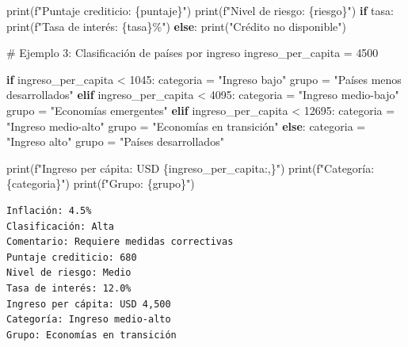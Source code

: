 \documentclass[
  doc,
  floatsintext,
  longtable,
  a4paper,
  nolmodern,
  notxfonts,
  notimes,
  12pt,
  colorlinks=true,linkcolor=blue,citecolor=blue,urlcolor=blue]{apa7}
\newenvironment{Shaded}{\begin{snugshade}}{\end{snugshade}}
\newcommand{\BuiltInTok}[1]{\textcolor[rgb]{0.00,0.23,0.31}{#1}}
\newcommand{\CommentTok}[1]{\textcolor[rgb]{0.37,0.37,0.37}{#1}}
\newcommand{\ControlFlowTok}[1]{\textcolor[rgb]{0.00,0.23,0.31}{\textbf{#1}}}
\newcommand{\DecValTok}[1]{\textcolor[rgb]{0.68,0.00,0.00}{#1}}
\newcommand{\NormalTok}[1]{\textcolor[rgb]{0.00,0.23,0.31}{#1}}
\newcommand{\OperatorTok}[1]{\textcolor[rgb]{0.37,0.37,0.37}{#1}}
\newcommand{\SpecialCharTok}[1]{\textcolor[rgb]{0.37,0.37,0.37}{#1}}
\newcommand{\SpecialStringTok}[1]{\textcolor[rgb]{0.13,0.47,0.30}{#1}}
\newcommand{\StringTok}[1]{\textcolor[rgb]{0.13,0.47,0.30}{#1}}
\begin{document}
\begin{Shaded}
\begin{Highlighting}[]
\BuiltInTok{print}\NormalTok{(}\SpecialStringTok{f"Puntaje crediticio: }\SpecialCharTok{\{}\NormalTok{puntaje}\SpecialCharTok{\}}\SpecialStringTok{"}\NormalTok{)}
\BuiltInTok{print}\NormalTok{(}\SpecialStringTok{f"Nivel de riesgo: }\SpecialCharTok{\{}\NormalTok{riesgo}\SpecialCharTok{\}}\SpecialStringTok{"}\NormalTok{)}
\ControlFlowTok{if}\NormalTok{ tasa:}
    \BuiltInTok{print}\NormalTok{(}\SpecialStringTok{f"Tasa de interés: }\SpecialCharTok{\{}\NormalTok{tasa}\SpecialCharTok{\}}\SpecialStringTok{\%"}\NormalTok{)}
\ControlFlowTok{else}\NormalTok{:}
    \BuiltInTok{print}\NormalTok{(}\StringTok{"Crédito no disponible"}\NormalTok{)}

\CommentTok{\# Ejemplo 3: Clasificación de países por ingreso}
\NormalTok{ingreso\_per\_capita }\OperatorTok{=} \DecValTok{4500}

\ControlFlowTok{if}\NormalTok{ ingreso\_per\_capita }\OperatorTok{\textless{}} \DecValTok{1045}\NormalTok{:}
\NormalTok{    categoria }\OperatorTok{=} \StringTok{"Ingreso bajo"}
\NormalTok{    grupo }\OperatorTok{=} \StringTok{"Países menos desarrollados"}
\ControlFlowTok{elif}\NormalTok{ ingreso\_per\_capita }\OperatorTok{\textless{}} \DecValTok{4095}\NormalTok{:}
\NormalTok{    categoria }\OperatorTok{=} \StringTok{"Ingreso medio{-}bajo"}
\NormalTok{    grupo }\OperatorTok{=} \StringTok{"Economías emergentes"}
\ControlFlowTok{elif}\NormalTok{ ingreso\_per\_capita }\OperatorTok{\textless{}} \DecValTok{12695}\NormalTok{:}
\NormalTok{    categoria }\OperatorTok{=} \StringTok{"Ingreso medio{-}alto"}
\NormalTok{    grupo }\OperatorTok{=} \StringTok{"Economías en transición"}
\ControlFlowTok{else}\NormalTok{:}
\NormalTok{    categoria }\OperatorTok{=} \StringTok{"Ingreso alto"}
\NormalTok{    grupo }\OperatorTok{=} \StringTok{"Países desarrollados"}

\BuiltInTok{print}\NormalTok{(}\SpecialStringTok{f"Ingreso per cápita: USD }\SpecialCharTok{\{}\NormalTok{ingreso\_per\_capita}\SpecialCharTok{:,\}}\SpecialStringTok{"}\NormalTok{)}
\BuiltInTok{print}\NormalTok{(}\SpecialStringTok{f"Categoría: }\SpecialCharTok{\{}\NormalTok{categoria}\SpecialCharTok{\}}\SpecialStringTok{"}\NormalTok{)}
\BuiltInTok{print}\NormalTok{(}\SpecialStringTok{f"Grupo: }\SpecialCharTok{\{}\NormalTok{grupo}\SpecialCharTok{\}}\SpecialStringTok{"}\NormalTok{)}
\end{Highlighting}
\end{Shaded}

\begin{verbatim}
Inflación: 4.5%
Clasificación: Alta
Comentario: Requiere medidas correctivas
Puntaje crediticio: 680
Nivel de riesgo: Medio
Tasa de interés: 12.0%
Ingreso per cápita: USD 4,500
Categoría: Ingreso medio-alto
Grupo: Economías en transición
\end{verbatim}
\end{document}

